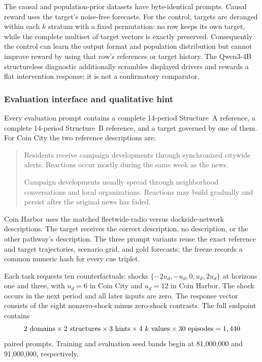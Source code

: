 The causal and population-prior datasets have byte-identical prompts. Causal
reward uses the target's noise-free forecasts. For the control, targets are
deranged within each $k$ stratum with a fixed permutation: no row keeps its own
target, while the complete multiset of target vectors is exactly preserved.
Consequently the control can learn the output format and population distribution
but cannot improve reward by using that row's references or target history.
The Qwen3-4B structureless diagnostic additionally scrambles displayed drivers
and rewards a flat intervention response; it is not a confirmatory comparator.



\subsubsection{Evaluation interface and qualitative hint}

Every evaluation prompt contains a complete 14-period Structure~A reference, a
complete 14-period Structure~B reference, and a target governed by one of them.
For Coin City the two reference descriptions are:
\begin{quote}\small
Residents receive campaign developments through synchronized citywide alerts.
Reactions occur mostly during the same week as the news.

Campaign developments usually spread through neighborhood conversations and
local organizations. Reactions may build gradually and persist after the
original news has faded.
\end{quote}
Coin Harbor uses the matched fleetwide-radio versus dockside-network descriptions.
The target receives the correct description, no description, or the other
pathway's description. The three prompt variants reuse the exact reference and
target trajectories, scenario grid, and gold forecasts; the freeze records a
common numeric hash for every cue triplet.

Each task requests ten counterfactuals: shocks
$\{-2u_d,-u_d,0,u_d,2u_d\}$ at horizons one and three, with $u_d=6$ in Coin City
and $u_d=12$ in Coin Harbor. The shock occurs in the next period and all later
inputs are zero. The response vector consists of the eight nonzero-shock minus
zero-shock contrasts. The full endpoint contains
\[
2\ {\rm domains}\times2\ {\rm structures}\times3\ {\rm hints}\times
4\ k{\rm\ values}\times30\ {\rm episodes}=1,440
\]
paired prompts. Training and evaluation seed bands begin at 81,000,000 and
91,000,000, respectively.

